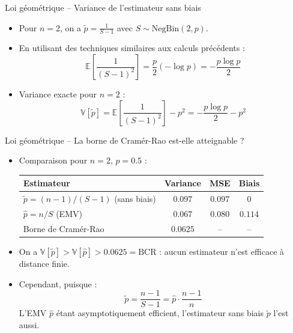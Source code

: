 \documentclass[11pt,aspectratio=169]{beamer}
\begin{document}
\begin{frame}{Loi géométrique -- Variance de l'estimateur sans biais}

\begin{itemize}

\item Pour $n=2$, on a $\tilde{p} = \frac{1}{S-1}$ avec $S \sim \text{NegBin}(2, p)$.\newline

\item En utilisant des techniques similaires aux calculs précédents :
  \[
  \mathbb{E}\left[\frac{1}{(S-1)^2}\right] = \frac{p}{2}(-\log p) = -\frac{p \log p}{2}
  \]

\item Variance exacte pour $n = 2$ :
  \[
  \mathbb{V}[\tilde{p}] = \mathbb{E}\left[\frac{1}{(S-1)^2}\right] - p^2 = -\frac{p \log p}{2} - p^2
  \]

\end{itemize}

\end{frame}

\begin{frame}{Loi géométrique -- La borne de Cramér-Rao est-elle atteignable ?}

\begin{itemize}

\item Comparaison pour $n = 2$, $p = 0.5$ :\newline
  \begin{center}
  \begin{tabular}{lccc}
  \hline
  Estimateur & Variance & MSE & Biais \\
  \hline
  $\tilde{p} = (n-1)/(S-1)$ (sans biais) & $0.097$ & $0.097$ & $0$ \\
  $\hat{p} = n/S$ (EMV) & $0.067$ & $0.080$ & $0.114$ \\
  \hline
  Borne de Cramér-Rao & $0.0625$ & -- & -- \\
  \hline
  \end{tabular}
  \end{center}

  \medskip
  
\item On a $\mathbb{V}[\tilde{p}] > \mathbb{V}[\hat{p}] > 0.0625 = \text{BCR}$ : aucun estimateur n'est efficace à distance finie.\newline

\item Cependant, puisque :
  \[
  \tilde{p} = \frac{n-1}{S-1} = \hat{p} \cdot \frac{n-1}{n}
  \]
  L'EMV $\hat{p}$ étant asymptotiquement efficient, l'estimateur sans biais $\tilde{p}$ l'est aussi.

\end{itemize}

\end{frame}
\end{document}
